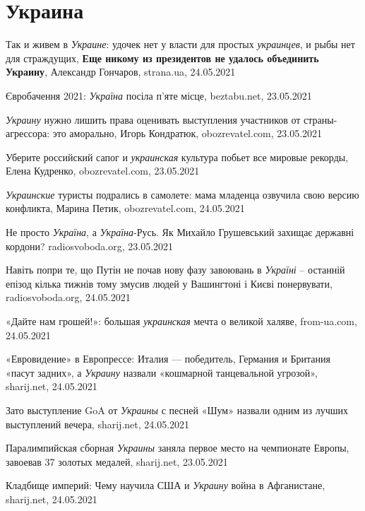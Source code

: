  
 
 
 
 
\chapter{Украина}

Так и живем в \emph{Украине}: удочек нет у власти для простых \emph{украинцев},
и рыбы нет для страждущих, \textbf{Еще никому из президентов не удалось объединить
Украину}, Александр Гончаров, strana.ua, 24.05.2021

Євробачення 2021: \emph{Україна} посіла п'яте місце, beztabu.net, 23.05.2021

\emph{Украину} нужно лишить права оценивать выступления участников от
страны-агрессора: это аморально, Игорь Кондратюк, obozrevatel.com, 23.05.2021

Уберите российский сапог и \emph{украинская} культура побьет все мировые
рекорды, Елена Кудренко, obozrevatel.com, 23.05.2021

\emph{Украинские} туристы подрались в самолете: мама младенца озвучила свою
версию конфликта, Марина Петик, obozrevatel.com, 24.05.2021

Не просто \emph{Україна}, а \emph{Україна}-Русь. Як Михайло Грушевський захищає
державні кордони?  radiosvoboda.org, 23.05.2021

Навіть попри те, що Путін не почав нову фазу завоювань в \emph{Україні} –
останній епізод кілька тижнів тому змусив людей у Вашингтоні і Києві
понервувати,
radiosvoboda.org, 24.05.2021

«Дайте нам грошей!»: большая \emph{украинская} мечта о великой халяве, from-ua.com, 24.05.2021

«Евровидение» в Европрессе: Италия — победитель, Германия и Британия  «пасут
задних», а \emph{Украину} назвали «кошмарной танцевальной угрозой», sharij.net,
24.05.2021

Зато выступление GoA от \emph{Украины} с песней «Шум» назвали одним из лучших
выступлений вечера,
sharij.net, 24.05.2021

Паралимпийская сборная \emph{Украины} заняла первое место на чемпионате Европы,
завоевав 37 золотых медалей, sharij.net, 23.05.2021

Кладбище империй: Чему научила США и \emph{Украину} война в Афганистане,
sharij.net, 24.05.2021

